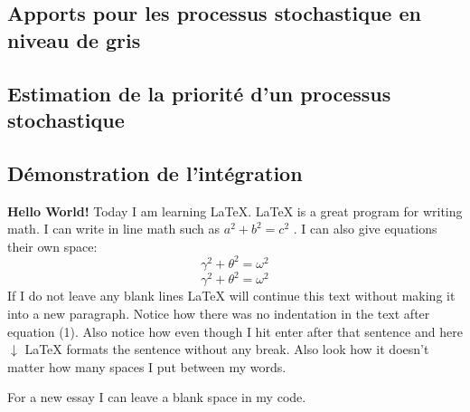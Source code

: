 \documentclass[twocolumn]{article} %
\begin{document}
\subsection{Apports pour les processus stochastique en niveau de gris}

\subsection{Estimation de la priorité d'un processus stochastique}

\subsection{Démonstration de l'intégration}

\textbf{Hello World!} Today I am learning \LaTeX. %
\LaTeX{} is a great program for writing math. I can write in line math such as $a^2+b^2=c^2$ %
. I can also give equations their own space:
\begin{equation} %
  \gamma^2+\theta^2=\omega^2
\end{equation}
\begin{equation} %
  \gamma^2+\theta^2=\omega^2
\end{equation}
If I do not leave any blank lines \LaTeX{} will continue  this text without making it into a new paragraph.  Notice how there was no indentation in the text after equation (1).
Also notice how even though I hit enter after that sentence and here $\downarrow$
\LaTeX{} formats the sentence without any break.  Also   look  how      it   doesn't     matter          how    many  spaces     I put     between       my    words.

For a new essay I can leave a blank space in my code.
\end{document}
